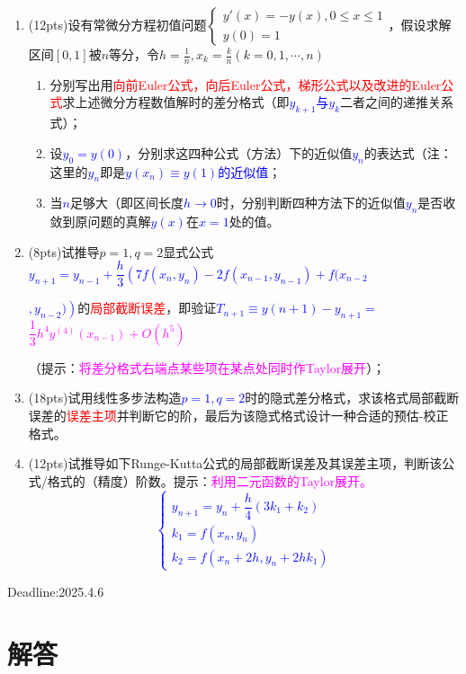 \documentclass[cn,hazy,green,11pt,normal]{elegantnote}
\begin{document}
        \begin{enumerate}
            \item (12pts)设有常微分方程初值问题$\begin{cases}y'(x)=-y(x),0\leq x\leq 1\\y(0)=1\end{cases}$，假设求解区间$[0,1]$被$n$等分，令$h=\frac1n,x_k=\frac kn(k=0,1,\cdots,n)$
                \begin{enumerate}
                    \item 分别写出用\textcolor{red}{向前Euler公式，向后Euler公式，梯形公式以及改进的Euler公式}求上述微分方程数值解时的差分格式（即\textcolor{blue}{$y_{k+1}$与$y_k$}二者之间的递推关系式）；
                    \item 设\textcolor{blue}{$y_0=y(0)$}，分别求这四种公式（方法）下的近似值\textcolor{blue}{$y_n$}的表达式（注：这里的\textcolor{blue}{$y_n$}即是\textcolor{blue}{$y(x_n)\equiv y(1)$的近似值}；
                    \item 当\textcolor{blue}{$n$}足够大（即区间长度\textcolor{blue}{$h\rightarrow 0$}时，分别判断四种方法下的近似值\textcolor{blue}{$y_n$}是否收敛到原问题的真解\textcolor{blue}{$y(x)$}在\textcolor{blue}{$x=1$}处的值。
                \end{enumerate}

            \item (8pts)试推导$p=1,q=2$显式公式\textcolor{blue}{$y_{n+1}=y_{n-1}+\dfrac h3\left(7f(x_n,y_n)-2f(x_{n-1},y_{n-1})+f(x_{n-2}\right.$}

                 \textcolor{blue}{$\left.,y_{n-2})\right)$}的\textcolor{red}{局部截断误差}，即验证\textcolor{blue}{$T_{n+1}\equiv y(n+1)-y_{n+1}=\,\,$}\textcolor{magenta}{$\dfrac13 h^4 y^{(4)}(x_{n-1})+O(h^5)$}

                （提示：\textcolor{magenta}{将差分格式右端点某些项在某点处同时作Taylor展开}）；
            \item (18pts)试用线性多步法构造\textcolor{blue}{$p=1,q=2$}时的隐式差分格式，求该格式局部截断误差的\textcolor{red}{误差主项}并判断它的阶，最后为该隐式格式设计一种合适的预估-校正格式。
            \item (12pts)试推导如下Runge-Kutta公式的局部截断误差及其误差主项，判断该公式/格式的（精度）阶数。提示：\textcolor{magenta}{利用二元函数的Taylor展开。}
                \textcolor{blue}{\[\begin{cases}y_{n+1}=y_n+\dfrac h4(3k_1+k_2)\\k_1=f(x_n,y_n)\\k_2=f(x_n+2h,y_n+2hk_1)\end{cases}\]}

        \end{enumerate}

        Deadline:2025.4.6

\section{解答}
\end{document}
